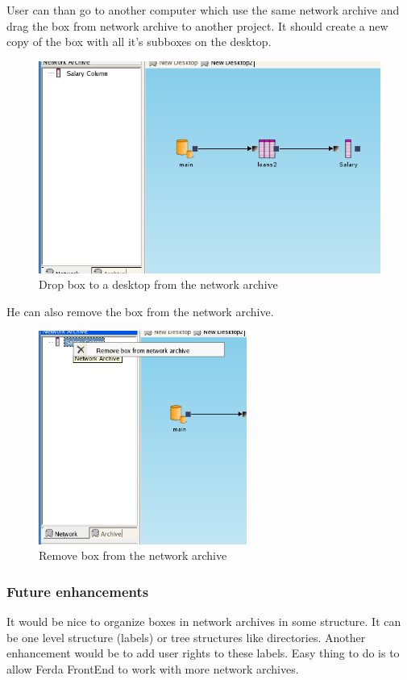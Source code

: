\documentclass[a4paper,12pt]{book}
\begin{document}
User can than go to another computer which use the same network archive and drag the box from network archive to another project. It should create a new copy of the box with all it's subboxes on the desktop.
\begin{figure}
	\includegraphics[width=12cm]{network_archive_drop_to_desktop}
	\caption{Drop box to a desktop from the network archive}
\end{figure}
He can also remove the box from the network archive.
\begin{figure}
	\includegraphics[height=7cm]{network_archive_remove_box}
	\caption{Remove box from the network archive}
\end{figure}

\subsubsection{Future enhancements}
It would be nice to organize boxes in network archives in some structure. It can be one level structure (labels) or tree structures like directories. Another enhancement would be to add user rights to these labels. Easy thing to do is to allow Ferda FrontEnd to work with more network archives.
\end{document}
